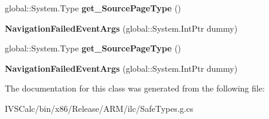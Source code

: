 \begin{DoxyCompactItemize}
global\+::\+System.\+Type {\bfseries get\+\_\+\+Source\+Page\+Type} ()
\item 
\mbox{\label{class_windows_1_1_u_i_1_1_xaml_1_1_navigation_1_1_navigation_failed_event_args_a5a5d4d3a633a5c6756a07e241af493a5}} 
{\bfseries Navigation\+Failed\+Event\+Args} (global\+::\+System.\+Int\+Ptr dummy)
\item 
\mbox{\label{class_windows_1_1_u_i_1_1_xaml_1_1_navigation_1_1_navigation_failed_event_args_a9146666066a65bc100683358777dcb20}} 
global\+::\+System.\+Type {\bfseries get\+\_\+\+Source\+Page\+Type} ()
\item 
\mbox{\label{class_windows_1_1_u_i_1_1_xaml_1_1_navigation_1_1_navigation_failed_event_args_a5a5d4d3a633a5c6756a07e241af493a5}} 
{\bfseries Navigation\+Failed\+Event\+Args} (global\+::\+System.\+Int\+Ptr dummy)
\end{DoxyCompactItemize}


The documentation for this class was generated from the following file\+:\begin{DoxyCompactItemize}
\item 
I\+V\+S\+Calc/bin/x86/\+Release/\+A\+R\+M/ilc/Safe\+Types.\+g.\+cs\end{DoxyCompactItemize}

